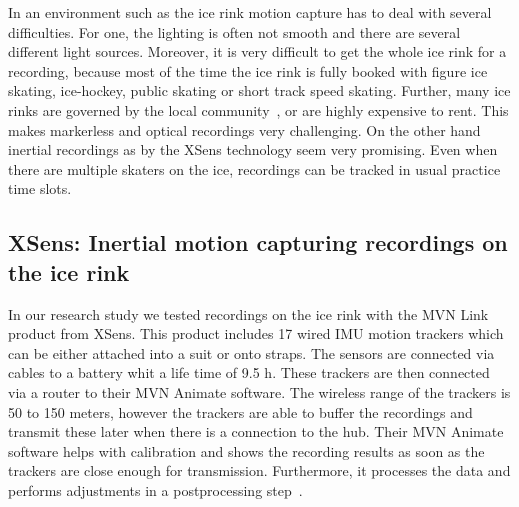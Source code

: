 In an environment such as the ice rink motion capture has to deal with several difficulties.
For one, the lighting is often not smooth and there are several different light sources.
Moreover, it is very difficult to get the whole ice rink for a recording, because most of the time the ice rink is fully
booked with figure ice skating, ice-hockey, public skating or short track speed skating.
Further, many ice rinks are governed by the local community~\cite{stuttgarteiswelt}, or are highly expensive to rent.
This makes markerless and optical recordings very challenging.
On the other hand inertial recordings as by the XSens technology seem very promising.
Even when there are multiple skaters on the ice, recordings can be tracked in usual practice time slots.

\subsection{XSens: Inertial motion capturing recordings on the ice rink}
In our research study we tested recordings on the ice rink with the MVN Link product from XSens.
This product includes 17 wired IMU motion trackers which can be either attached into a suit or onto straps.
The sensors are connected via cables to a battery whit a life time of 9.5 h.
These trackers are then connected via a router to their MVN Animate software.
The wireless range of the trackers is 50 to 150 meters, however the trackers are able to buffer the recordings
and transmit these later when there is a connection to the hub.
Their MVN Animate software helps with calibration and shows the recording results as soon as the trackers are close
enough
for transmission.
Furthermore, it processes the data and performs adjustments in a postprocessing step~\cite{xsensmvnanimate}.

